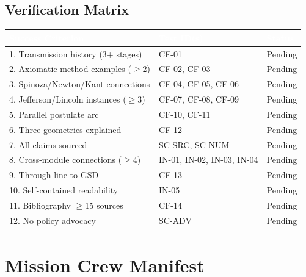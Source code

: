 \documentclass[11pt,letterpaper]{article}
\newcommand{\tableheader}[1]{\textbf{\sffamily\textcolor{white}{#1}}}
\begin{document}
\subsection{Verification Matrix}

\begin{center}
\begin{tabularx}{\textwidth}{XL{3cm}C{1.5cm}}
\toprule
{}
\tableheader{Success Criterion} & \tableheader{Test ID(s)} & \tableheader{Status} \\
. Transmission history (3+ stages) & CF-01 & Pending \\
2. Axiomatic method examples ($\geq$2) & CF-02, CF-03 & Pending \\
3. Spinoza/Newton/Kant connections & CF-04, CF-05, CF-06 & Pending \\
4. Jefferson/Lincoln instances ($\geq$3) & CF-07, CF-08, CF-09 & Pending \\
5. Parallel postulate arc & CF-10, CF-11 & Pending \\
6. Three geometries explained & CF-12 & Pending \\
7. All claims sourced & SC-SRC, SC-NUM & Pending \\
8. Cross-module connections ($\geq$4) & IN-01, IN-02, IN-03, IN-04 & Pending \\
9. Through-line to GSD & CF-13 & Pending \\
10. Self-contained readability & IN-05 & Pending \\
11. Bibliography $\geq$15 sources & CF-14 & Pending \\
12. No policy advocacy & SC-ADV & Pending \\
\bottomrule
\end{tabularx}
\end{center}

\section{Mission Crew Manifest}
\end{document}
